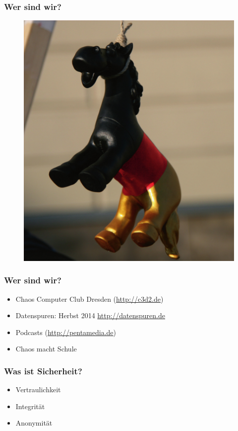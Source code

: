 \documentclass[12pt]{beamer}
\begin{document}
\begin{frame}
  \frametitle{Wer sind wir?}
  \begin{figure}
    \includegraphics[height=0.7\textheight]{img/trojaner.jpg}
  \end{figure}
\end{frame}

\begin{frame}
    \frametitle{Wer sind wir?}
    \begin{itemize}
      \item<1-> Chaos Computer Club Dresden (\url{http://c3d2.de})
          \note{}
      \item<2-> Datenspuren: Herbst 2014 \url{http://datenspuren.de}
      \item<3-> Podcasts (\url{http://pentamedia.de})
      \item<4-> Chaos macht Schule
    \end{itemize}
\end{frame}

\begin{frame}
    \frametitle{Was ist Sicherheit?}
    \begin{itemize}
      \item<2-> Vertraulichkeit
      \item<3-> Integrität
      \item<4-> Anonymität
    \end{itemize}
\end{frame}
\end{document}

